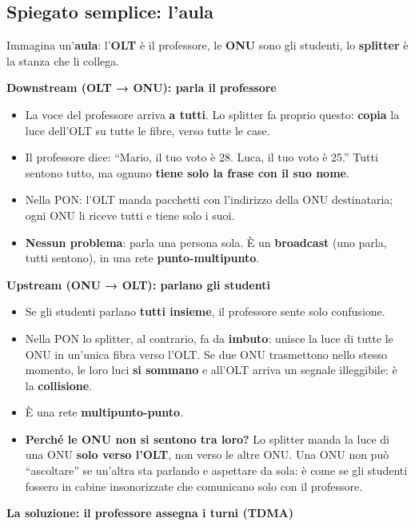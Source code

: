 \subsection{Spiegato semplice: l'aula}

Immagina un'\textbf{aula}: l'\textbf{OLT} è il professore, le \textbf{ONU} sono gli studenti, lo \textbf{splitter} è la stanza che li collega.

\textbf{Downstream (OLT → ONU): parla il professore}

\begin{itemize}
\tightlist
\item
  La voce del professore arriva \textbf{a tutti}. Lo splitter fa proprio questo: \textbf{copia} la luce dell'OLT su tutte le fibre, verso tutte le case.
\item
  Il professore dice: ``Mario, il tuo voto è 28. Luca, il tuo voto è 25.'' Tutti sentono tutto, ma ognuno \textbf{tiene solo la frase con il suo nome}.
\item
  Nella PON: l'OLT manda pacchetti con l'indirizzo della ONU destinataria; ogni ONU li riceve tutti e tiene solo i suoi.
\item
  \textbf{Nessun problema}: parla una persona sola. È un \textbf{broadcast} (uno parla, tutti sentono), in una rete \textbf{punto-multipunto}.
\end{itemize}

\textbf{Upstream (ONU → OLT): parlano gli studenti}

\begin{itemize}
\tightlist
\item
  Se gli studenti parlano \textbf{tutti insieme}, il professore sente solo confusione.
\item
  Nella PON lo splitter, al contrario, fa da \textbf{imbuto}: unisce la luce di tutte le ONU in un'unica fibra verso l'OLT. Se due ONU trasmettono nello stesso momento, le loro luci \textbf{si sommano} e all'OLT arriva un segnale illeggibile: è la \textbf{collisione}.
\item
  È una rete \textbf{multipunto-punto}.
\item
  \textbf{Perché le ONU non si sentono tra loro?} Lo splitter manda la luce di una ONU \textbf{solo verso l'OLT}, non verso le altre ONU. Una ONU non può ``ascoltare'' se un'altra sta parlando e aspettare da sola: è come se gli studenti fossero in cabine insonorizzate che comunicano solo con il professore.
\end{itemize}

\textbf{La soluzione: il professore assegna i turni (TDMA)}

